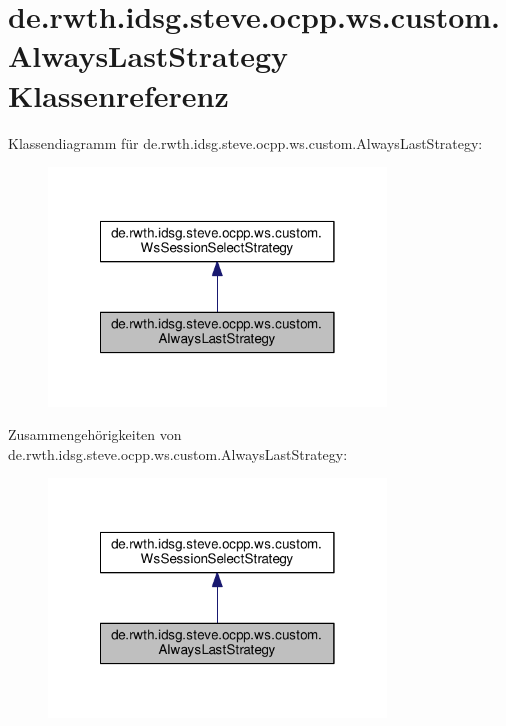 \hypertarget{classde_1_1rwth_1_1idsg_1_1steve_1_1ocpp_1_1ws_1_1custom_1_1_always_last_strategy}{\section{de.\-rwth.\-idsg.\-steve.\-ocpp.\-ws.\-custom.\-Always\-Last\-Strategy Klassenreferenz}
\label{classde_1_1rwth_1_1idsg_1_1steve_1_1ocpp_1_1ws_1_1custom_1_1_always_last_strategy}
}


Klassendiagramm für de.\-rwth.\-idsg.\-steve.\-ocpp.\-ws.\-custom.\-Always\-Last\-Strategy\-:
\nopagebreak
\begin{figure}[H]
\begin{center}
\leavevmode
\includegraphics[width=254pt]{classde_1_1rwth_1_1idsg_1_1steve_1_1ocpp_1_1ws_1_1custom_1_1_always_last_strategy__inherit__graph}
\end{center}
\end{figure}


Zusammengehörigkeiten von de.\-rwth.\-idsg.\-steve.\-ocpp.\-ws.\-custom.\-Always\-Last\-Strategy\-:
\nopagebreak
\begin{figure}[H]
\begin{center}
\leavevmode
\includegraphics[width=254pt]{classde_1_1rwth_1_1idsg_1_1steve_1_1ocpp_1_1ws_1_1custom_1_1_always_last_strategy__coll__graph}
\end{center}
\end{figure}
